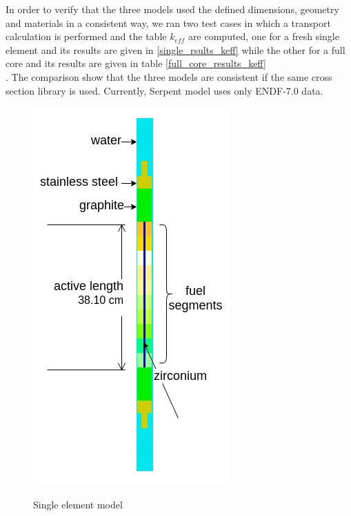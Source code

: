 \documentclass[review]{elsarticle}
\begin{document}
 In order to verify that the three models used the defined dimensions, geometry and materials in a consistent way, we ran two test cases in which a transport calculation is performed and the table $k_{eff}$ are computed, one for a fresh single element and its results are given in \ref{single_rsults_keff} while the other for a full core and its results are given in table \ref{full_core_results_keff} \\.
 The comparison show that the three models are consistent if the same cross section library is used. Currently, Serpent model uses only ENDF-7.0 data.
 

 \begin{figure}[h]
 	\centering
 	\includegraphics[scale=0.5]{single_element.jpg}\\
 	\caption{Single element model}
 	\label{fig:sigle_element_model}
 	\end{figure}
 
\end{document}

